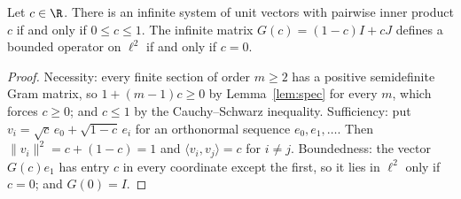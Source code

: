 \begin{theorem}\label{thm:main}
Let $c\in\R$. There is an infinite system of unit vectors with pairwise inner product $c$ if and only if $0\le c\le1$.
The infinite matrix $G(c)=(1-c)I+cJ$ defines a bounded operator on $\ell^2$ if and only if $c=0$.
\end{theorem}
\begin{proof}
Necessity: every finite section of order $m\ge2$ has a positive semidefinite Gram matrix, so $1+(m-1)c\ge0$ by Lemma~\ref{lem:spec} for every $m$, which forces $c\ge0$; and $c\le1$ by the Cauchy--Schwarz inequality.
Sufficiency: put $v_i=\sqrt c\,e_0+\sqrt{1-c}\,e_i$ for an orthonormal sequence $e_0,e_1,\dots$. Then $\|v_i\|^2=c+(1-c)=1$ and $\langle v_i,v_j\rangle=c$ for $i\ne j$.
Boundedness: the vector $G(c)e_1$ has entry $c$ in every coordinate except the first, so it lies in $\ell^2$ only if $c=0$; and $G(0)=I$.
\end{proof}
